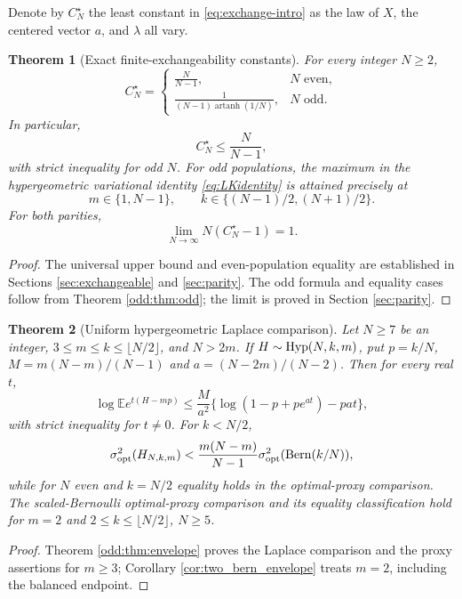 \documentclass[11pt,a4paper]{article}
\newtheorem{theorem}{Theorem}[section]
\newcommand{\E}{\mathbb E}\newcommand{\R}{\mathbb R}\newcommand{\N}{\mathbb N}\newcommand{\one}{\mathbf1}
\newcommand{\CN}{C_N^\star}
\begin{document}
Denote by $\CN$ the least constant in \eqref{eq:exchange-intro} as the law of $X$, the centered vector $a$, and $\lambda$ all vary.
\begin{theorem}[Exact finite-exchangeability constants]\label{thm:exchange}
For every integer $N\ge2$,
\begin{equation}\label{eq:CNexact}
 \boxed{\quad C_N^\star=\begin{cases}
 \displaystyle\frac{N}{N-1},&N\text{ even},\\[5pt]
 \displaystyle\frac{1}{(N-1)\operatorname{artanh}(1/N)},&N\text{ odd}.
 \end{cases}\quad}
\end{equation}
In particular,
\begin{equation}\label{eq:CNupper}
 C_N^\star\le\frac{N}{N-1},
\end{equation}
with strict inequality for odd $N$. For odd populations, the maximum in the hypergeometric variational identity \eqref{eq:LKidentity} is attained precisely at
\begin{equation}\label{eq:odd_extremizers}
 m\in\{1,N-1\},\qquad k\in\{(N-1)/2,(N+1)/2\}.
\end{equation}
For both parities,
\begin{equation}\label{eq:asymptotic}
 \lim_{N\to\infty}N(C_N^\star-1)=1.
\end{equation}
\end{theorem}
\begin{proof}
The universal upper bound and even-population equality are established in Sections \ref{sec:exchangeable} and \ref{sec:parity}. The odd formula and equality cases follow from Theorem \ref{odd:thm:odd}; the limit is proved in Section \ref{sec:parity}.
\end{proof}

\begin{theorem}[Uniform hypergeometric Laplace comparison]\label{thm:main_laplace}
Let $N\ge7$ be an integer, $3\le m\le k\le\lfloor N/2\rfloor$, and $N>2m$. If $H\sim\operatorname{Hyp}(N,k,m)$, put $p=k/N$, $M=m(N-m)/(N-1)$ and $a=(N-2m)/(N-2)$. Then for every real $t$,
\begin{equation}\label{eq:main_laplace}
 \log\E e^{t(H-mp)}\le\frac{M}{a^2}\{\log(1-p+pe^{at})-pat\},
\end{equation}
with strict inequality for $t\ne0$. For $k<N/2$,
\begin{equation}\label{eq:main_bern_envelope}
 \sigma^2_{\mathrm{opt}}(H_{N,k,m})
 <\frac{m(N-m)}{N-1}\sigma^2_{\mathrm{opt}}(\operatorname{Bern}(k/N)),
\end{equation}
while for $N$ even and $k=N/2$ equality holds in the optimal-proxy comparison. The scaled-Bernoulli optimal-proxy comparison and its equality classification hold for $m=2$ and $2\le k\le\lfloor N/2\rfloor$, $N\ge5$.
\end{theorem}
\begin{proof}
Theorem \ref{odd:thm:envelope} proves the Laplace comparison and the proxy assertions for $m\ge3$; Corollary \ref{cor:two_bern_envelope} treats $m=2$, including the balanced endpoint.
\end{proof}
\end{document}
